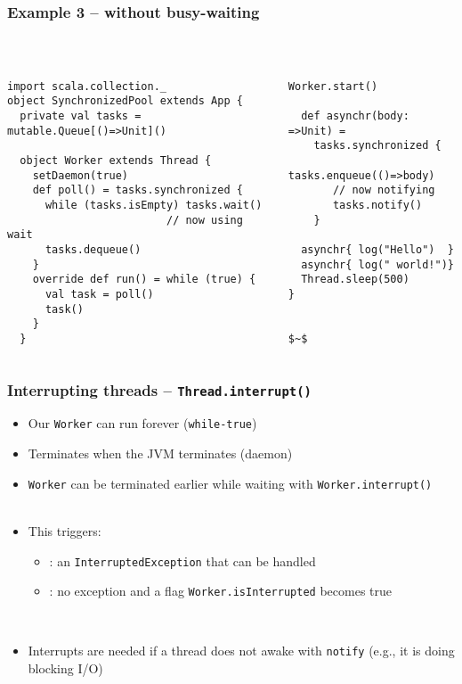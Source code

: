 \documentclass[aspectratio=169]{beamer}
\begin{document}
\begin{frame}[fragile]\frametitle{Example 3 -- without busy-waiting}
~\\[-8mm]
\begin{columns}
\begin{column}{0.65\textwidth}
\begin{lstlisting}[emph={printUniqueIds,sleep,log,thread,join,synchronized,wait,notify}]
import scala.collection._
object SynchronizedPool extends App {
  private val tasks = mutable.Queue[()=>Unit]()

  object Worker extends Thread {
    setDaemon(true)
    def poll() = tasks.synchronized {
      while (tasks.isEmpty) tasks.wait()
                         // now using wait
      tasks.dequeue()
    }
    override def run() = while (true) {
      val task = poll()
      task()
    }
  }
\end{lstlisting}
\end{column}
\begin{column}{0.40\textwidth}
\begin{lstlisting}[mathescape,emph={sleep,log,thread,join,synchronized,wait,notify}]
  Worker.start()

  def asynchr(body: =>Unit) =
    tasks.synchronized {
       tasks.enqueue(()=>body)
       // now notifying
       tasks.notify()
    }

  asynchr{ log("Hello")  }
  asynchr{ log(" world!")}
  Thread.sleep(500)
}


$~$
\end{lstlisting}
\end{column}
\end{columns}


\end{frame}



\begin{frame}\frametitle{Interrupting threads -- \texttt{Thread.interrupt()}}
\begin{itemize}
  \item Our \texttt{Worker} can run forever (\texttt{while-true})
  \item Terminates when the JVM terminates (daemon)
  \item \texttt{Worker} can be terminated earlier while waiting with \alert{\texttt{Worker.interrupt()}}
  \pause
  \\~
  \item This triggers:
    \begin{itemize}
      \item {}: an \alert{\texttt{InterruptedException}} that can be handled
      \item {}: no exception and a flag \alert{\texttt{Worker.isInterrupted}} becomes true
    \end{itemize}
  ~\\\pause
  \item Interrupts are needed if a thread does not awake with \texttt{notify} (e.g., it is doing blocking I/O)
\end{itemize}
\end{frame}
\end{document}
